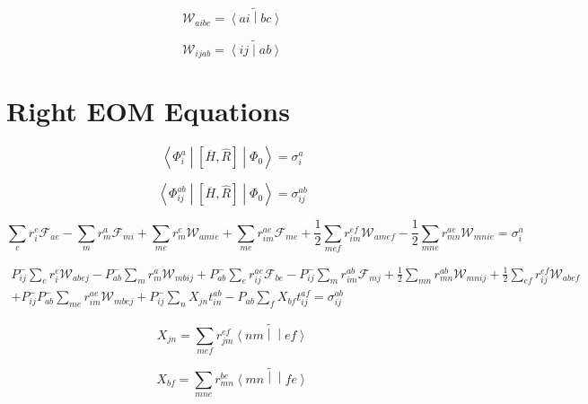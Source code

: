 \documentclass{article}
\newcommand{\tei}[2]{\left<{#1}\middle|\middle|{#2}\right>}
\begin{document}
\begin{equation}
  \mathcal{W}_{aibc} = \widetilde{\left<ai\middle|bc\right>}
\end{equation}

\begin{equation}
  \mathcal{W}_{ijab} = \widetilde{\left<ij\middle|ab\right>}
\end{equation}

\section{Right EOM Equations}

\begin{equation}
  \left<\Phi_i^a\middle|\left[\overline{H}, \hat{R}\right]\middle|\Phi_0\right> = \sigma_i^a
\end{equation}

\begin{equation}
  \left<\Phi_{ij}^{ab}\middle|\left[\overline{H}, \hat{R}\right]\middle|\Phi_0\right> = \sigma_{ij}^{ab}
\end{equation}

\begin{equation}
  \sum_er_i^e\mathcal{F}_{ae} - \sum_mr_m^a\mathcal{F}_{mi} + \sum_{me}r_m^e\mathcal{W}_{amie} + \sum_{me} r_{im}^{ae}\mathcal{F}_{me} + \frac{1}{2}\sum_{mef}r_{im}^{ef}\mathcal{W}_{amef} - \frac{1}{2}\sum_{mne}r_{mn}^{ae}\mathcal{W}_{mnie} = \sigma_i^a
\end{equation}

\begin{multline}
  P_{ij}^-\sum_er_i^e\mathcal{W}_{abej} - P_{ab}^-\sum_mr_m^a\mathcal{W}_{mbij} + P_{ab}^-\sum_er_{ij}^{ae}\mathcal{F}_{be} - P_{ij}^-\sum_mr_{im}^{ab}\mathcal{F}_{mj} + \frac{1}{2}\sum_{mn}r_{mn}^{ab}\mathcal{W}_{mnij} + \frac{1}{2}\sum_{ef}r_{ij}^{ef}\mathcal{W}_{abef} \\
  + P_{ij}^-P_{ab}^-\sum_{me}r_{im}^{ae}\mathcal{W}_{mbej} + P_{ij}^-\sum_nX_{jn}t_{in}^{ab} - P_{ab}\sum_fX_{bf}t_{ij}^{af} = \sigma_{ij}^{ab}
\end{multline}

\begin{equation}
  X_{jn} = \sum_{mef}r_{jm}^{ef}\widetilde{\tei{nm}{ef}}
\end{equation}

\begin{equation}
  X_{bf} = \sum_{mne}r_{mn}^{be}\widetilde{\tei{mn}{fe}}
\end{equation}
\end{document}
